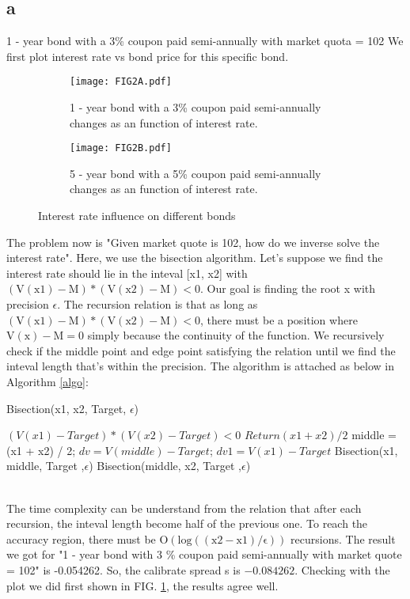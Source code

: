 \documentclass[a4paper,11pt]{article} %
\begin{document}
\subsection{a}
1 - year bond with a 3\% coupon paid semi-annually with market quota = 102
We first plot interest rate vs bond price for this specific bond.
\begin{figure}[hbt]
	\centering
	\begin{subfigure}{0.45\textwidth}
		\texttt{[image: FIG2A.pdf]}
		\caption{1 - year bond with a 3\% coupon paid semi-annually changes as an function of interest rate.}
		\label{FIG2A}
	\end{subfigure}
	\hfill
		\begin{subfigure}{0.45\textwidth}
		\texttt{[image: FIG2B.pdf]}
		\caption{5 - year bond with a 5\% coupon paid semi-annually changes as an function of interest rate.}
		\label{FIG2B}
	\end{subfigure}
	\label{FIG2}
	\caption{Interest rate influence on different bonds}
\end{figure}
The problem now is "Given market quote is 102, how do we inverse solve the interest rate". Here, we use the bisection algorithm.\cite{ehiwario2014comparative}  Let's suppose we find the interest rate should lie in the inteval [x1, x2] with $\mathrm{(V(x1) - M ) * (V(x2) - M) < 0}$. Our goal is finding the root x with precision $\epsilon$. The recursion relation is that as long as $\mathrm{(V(x1) - M ) * (V(x2) - M) < 0}$, there must be a position where $\mathrm{V(x) - M = 0}$ simply because the continuity of the function. We recursively check if the middle point and edge point satisfying the relation until we find the inteval length that's within the precision. The algorithm is attached as below in Algorithm \ref{algo}:
\begin{algorithm}[hbt]
	\caption{Bisection(x1, x2, Target, $\epsilon$)}
	\begin{algorithmic} 
		\REQUIRE $(V(x1) - Target ) * (V(x2) - Target) < 0$
		\STATE $Return ( x1 + x2 ) / 2$
		\ELSE
		\STATE middle = (x1 + x2) / 2;
		\STATE $dv = V(middle) - Target$;
		\STATE $dv1 = V(x1) - Target$
		\RETURN Bisection(x1, middle, Target ,$\epsilon$)
		\ELSE
		\RETURN Bisection(middle, x2, Target ,$\epsilon$)
		\ENDIF
		\ENDIF
	\end{algorithmic}
	\label{algo}
\end{algorithm}\\
The time complexity can be understand from the relation that after each recursion, the inteval length become half of the previous one. To reach the accuracy region, there must be $\mathrm{O(log((x2 - x1 )/ \epsilon))}$ recursions. The result we got for "1 - year bond with 3 \% coupon paid semi-annually with market quote = 102" is -0.054262. So, the calibrate spread s is $-0.084262$. Checking with the plot we did first shown in FIG. \ref{FIG2A}, the results agree well.
\end{document}
